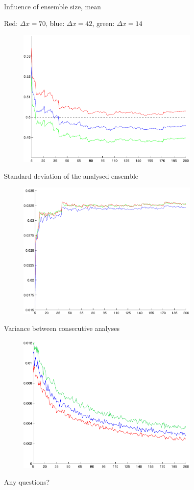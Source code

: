 \documentclass{beamer}
\begin{document}
\begin{frame}{Influence of ensemble size, mean}

Red: $\Delta x=70$, blue: $\Delta x=42$, green: $\Delta x=14$

\begin{figure}
\includegraphics[width=9cm]{mean_conv_2_6_10.pdf}
\end{figure}

\end{frame}

\begin{frame}{Standard deviation of the analysed ensemble}

\begin{figure}
\includegraphics[width=9cm]{ensemble_stdev.pdf}
\end{figure}

\end{frame}

\begin{frame}{Variance between consecutive analyses}

\begin{figure}
\includegraphics[width=9cm]{stdev_between_analysis.pdf}
\end{figure}

\end{frame}

\begin{frame}{Any questions?}


\end{frame}
\end{document}
